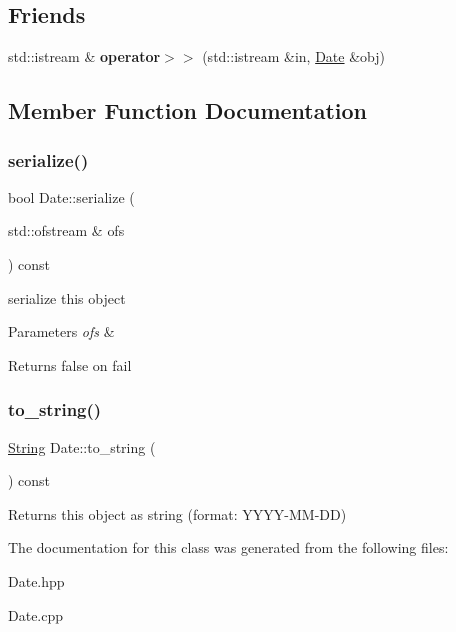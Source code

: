 \subsection*{Friends}
\begin{DoxyCompactItemize}
\item 
\mbox{\label{classDate_a025d4abf4e083a5f10d376259aac34a2}} 
std\+::istream \& {\bfseries operator$>$$>$} (std\+::istream \&in, \hyperlink{classDate}{Date} \&obj)
\end{DoxyCompactItemize}


\subsection{Member Function Documentation}
\mbox{\label{classDate_aaa7c624e382fff1ba3438cb46232c05e}} 
\subsubsection{\texorpdfstring{serialize()}{serialize()}}
{\footnotesize\ttfamily bool Date\+::serialize (\begin{DoxyParamCaption}\item[{std\+::ofstream \&}]{ofs }\end{DoxyParamCaption}) const}

serialize this object 
\begin{DoxyParams}{Parameters}
{\em ofs} & \\
\hline
\end{DoxyParams}
\begin{DoxyReturn}{Returns}
false on fail 
\end{DoxyReturn}
\mbox{\label{classDate_a4d4dfda9dfa34c87e06381254bfe5151}} 
\subsubsection{\texorpdfstring{to\+\_\+string()}{to\_string()}}
{\footnotesize\ttfamily \hyperlink{classString}{String} Date\+::to\+\_\+string (\begin{DoxyParamCaption}{ }\end{DoxyParamCaption}) const}

\begin{DoxyReturn}{Returns}
this object as string (format\+: Y\+Y\+Y\+Y-\/\+M\+M-\/\+DD) 
\end{DoxyReturn}


The documentation for this class was generated from the following files\+:\begin{DoxyCompactItemize}
\item 
Date.\+hpp\item 
Date.\+cpp\end{DoxyCompactItemize}
